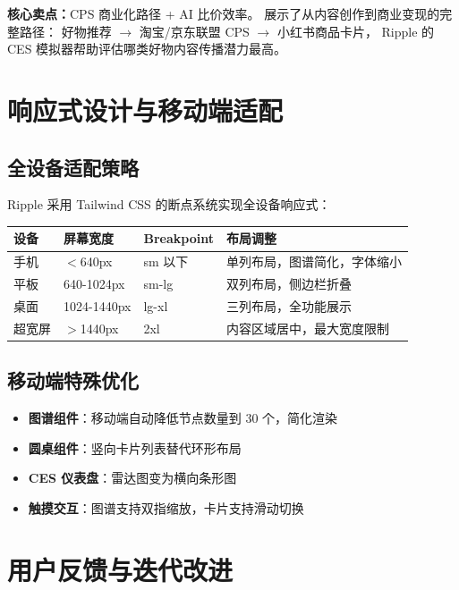 \documentclass[12pt,a4paper]{ctexart}
\begin{document}
\textbf{核心卖点：}CPS 商业化路径 + AI 比价效率。
展示了从内容创作到商业变现的完整路径：
好物推荐 $\rightarrow$ 淘宝/京东联盟 CPS $\rightarrow$ 小红书商品卡片，
Ripple 的 CES 模拟器帮助评估哪类好物内容传播潜力最高。


\section{响应式设计与移动端适配}

\subsection{全设备适配策略}

Ripple 采用 Tailwind CSS 的断点系统实现全设备响应式：

\begin{center}
\begin{tabular}{p{2.5cm} p{3cm} p{3cm} p{5cm}}
\toprule
\textbf{设备} & \textbf{屏幕宽度} & \textbf{Breakpoint} & \textbf{布局调整} \\
\midrule
手机 & $<$640px & sm 以下 & 单列布局，图谱简化，字体缩小 \\[2pt]
平板 & 640-1024px & sm-lg & 双列布局，侧边栏折叠 \\[2pt]
桌面 & 1024-1440px & lg-xl & 三列布局，全功能展示 \\[2pt]
超宽屏 & $>$1440px & 2xl & 内容区域居中，最大宽度限制 \\
\bottomrule
\end{tabular}
\end{center}

\subsection{移动端特殊优化}

\begin{itemize}
  \item \textbf{图谱组件}：移动端自动降低节点数量到 30 个，简化渲染
  \item \textbf{圆桌组件}：竖向卡片列表替代环形布局
  \item \textbf{CES 仪表盘}：雷达图变为横向条形图
  \item \textbf{触摸交互}：图谱支持双指缩放，卡片支持滑动切换
\end{itemize}


\section{用户反馈与迭代改进}
\end{document}
